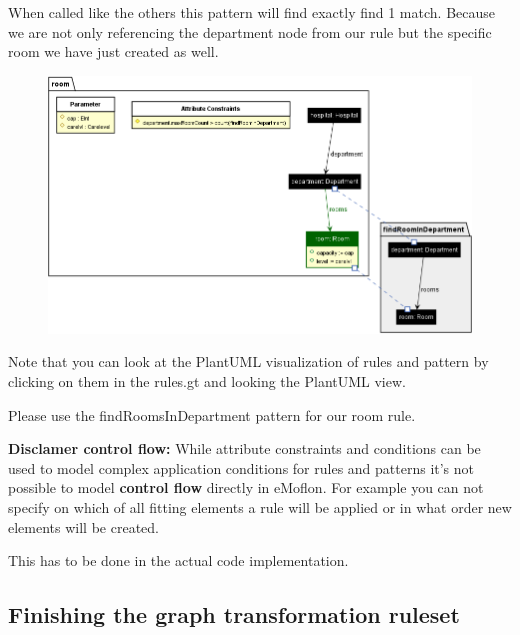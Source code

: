 When called like the others this pattern will find exactly find 1 match. Because we are not only referencing the department node from our rule but the specific room we have just created as well.

\begin{figure}[h]
    \centering
    \includegraphics[scale = 0.43]{pictures/findRoomInDepartment.png}
    \caption{}
    \label{attributeConstrains}

\end{figure}

Note that you can look at the PlantUML visualization of rules and pattern by clicking on them in the \textsf{rules.gt} and looking the PlantUML view. \newline

Please use the \textsf{findRoomsInDepartment} pattern for our room rule.\newline

\textbf{Disclamer control flow:}\newline
While attribute constraints and conditions can be used to model complex application conditions for rules and patterns
it's not possible to model \textbf{control flow} directly in eMoflon. For example you can not specify on which of all fitting elements a rule will be applied or in what order new elements will be created.

This has to be done in the actual code implementation.



\clearpage

\subsection{Finishing the graph transformation ruleset}

